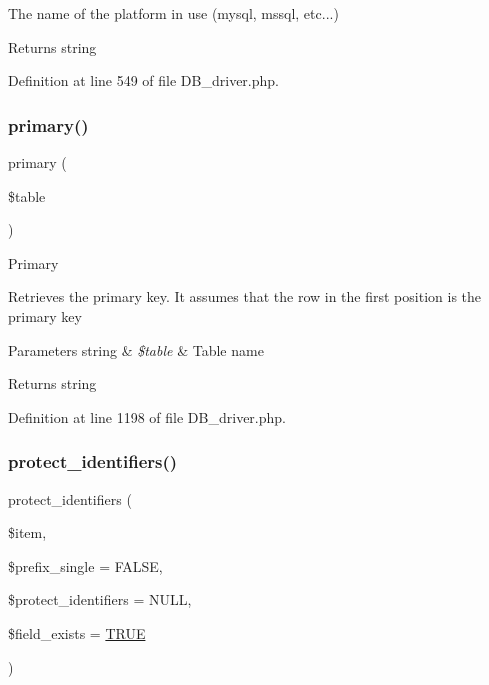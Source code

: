 The name of the platform in use (mysql, mssql, etc...)

\begin{DoxyReturn}{Returns}
string 
\end{DoxyReturn}


Definition at line 549 of file D\+B\+\_\+driver.\+php.

\mbox{\label{class_c_i___d_b__driver_a68e5f4a4a6fdb79a9a403b045c59b618}} 
\subsubsection{\texorpdfstring{primary()}{primary()}}
{\footnotesize\ttfamily primary (\begin{DoxyParamCaption}\item[{}]{\$table }\end{DoxyParamCaption})}

Primary

Retrieves the primary key. It assumes that the row in the first position is the primary key


\begin{DoxyParams}[1]{Parameters}
string & {\em \$table} & Table name \\
\hline
\end{DoxyParams}
\begin{DoxyReturn}{Returns}
string 
\end{DoxyReturn}


Definition at line 1198 of file D\+B\+\_\+driver.\+php.

\mbox{\label{class_c_i___d_b__driver_ade8e28ac268bbe2f985c5359bc949f21}} 
\subsubsection{\texorpdfstring{protect\_identifiers()}{protect\_identifiers()}}
{\footnotesize\ttfamily protect\+\_\+identifiers (\begin{DoxyParamCaption}\item[{}]{\$item,  }\item[{}]{\$prefix\+\_\+single = {\ttfamily FALSE},  }\item[{}]{\$protect\+\_\+identifiers = {\ttfamily NULL},  }\item[{}]{\$field\+\_\+exists = {\ttfamily \mbox{\hyperlink{constants_8php_ae04a3efe6aa42044f803ee90c2277846}{T\+R\+UE}}} }\end{DoxyParamCaption})}

